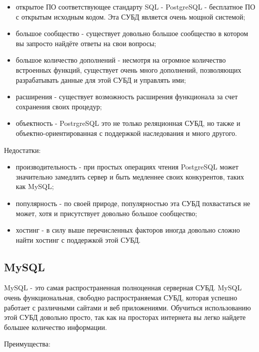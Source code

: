 \begin{itemize}
  \item открытое ПО соответствующее стандарту SQL - PostgreSQL - бесплатное ПО с открытым исходным кодом. Эта СУБД является очень мощной системой;
  \item большое сообщество - существует довольно большое сообщество в котором вы запросто найдёте ответы на свои вопросы;
  \item большое количество дополнений - несмотря на огромное количество встроенных функций, существует очень много дополнений, позволяющих разрабатывать данные для этой СУБД и управлять ими;
  \item расширения - существует возможность расширения функционала за счет сохранения своих процедур;
  \item объектность - PostrgreSQL это не только реляционная СУБД, но также и объектно-ориентированная с поддержкой наследования и много другого.
\end{itemize}

\hspace{0cm} Недостатки:

\begin{itemize}
  \item производительность - при простых операциях чтения PostgreSQL может значительно замедлить сервер и быть медленнее своих конкурентов, таких как MySQL;
  \item популярность - по своей природе, популярностью эта СУБД похвастаться не может, хотя и присутствует довольно большое сообщество;
  \item хостинг - в силу выше перечисленных факторов иногда довольно сложно найти хостинг с поддержкой этой СУБД.
\end{itemize}

\subsection{MySQL}

\hspace{0cm} MySQL - это самая распространенная полноценная серверная СУБД. MySQL очень функциональная, свободно распространяемая СУБД, которая успешно работает с различными сайтами и веб приложениями. Обучиться использованию этой СУБД довольно просто, так как на просторах интернета вы легко найдете большее количество информации\cite{web:SQLite}.

\hspace{0cm} Преимущества:

